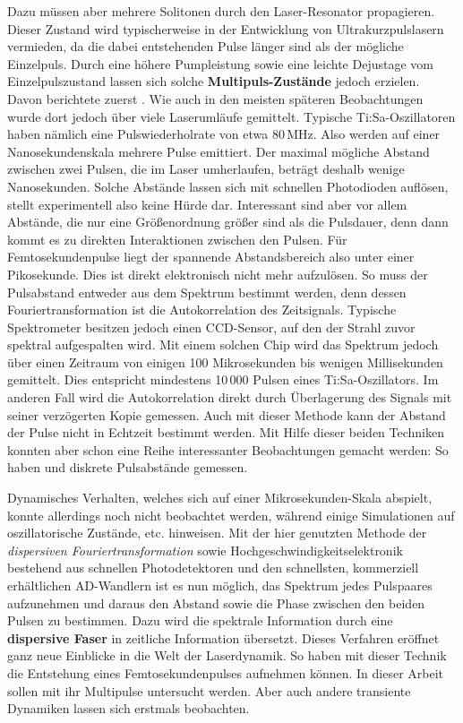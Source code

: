 \documentclass[bachelor,       %
               twoside,        %
               BCOR10mm,       %
               liststotoc,nomtotoc,bibtotoc, %
               english,ngerman, %
               final,          %
               ]{GAUBM}
\begin{document}
Dazu müssen aber mehrere Solitonen durch den Laser-Resonator propagieren.
Dieser Zustand wird typischerweise in der Entwicklung von Ultrakurzpulslasern vermieden, da die dabei entstehenden Pulse länger sind als der mögliche Einzelpuls.
Durch eine höhere Pumpleistung sowie eine leichte Dejustage vom Einzelpulszustand lassen sich solche \textbf{Multipuls-Zustände} jedoch erzielen.
Davon berichtete zuerst \cite{lai_multiple_1997}.
Wie auch in den meisten späteren Beobachtungen wurde dort jedoch über viele Laserumläufe gemittelt.
Typische Ti:Sa-Oszillatoren haben nämlich eine Pulswiederholrate von etwa 80\,MHz.
Also werden auf einer Nanosekundenskala mehrere Pulse emittiert.
Der maximal mögliche Abstand zwischen zwei Pulsen, die im Laser umherlaufen, beträgt deshalb wenige Nanosekunden.
Solche Abstände lassen sich mit schnellen Photodioden auflösen, stellt experimentell also keine Hürde dar.
Interessant sind aber vor allem Abstände, die nur eine Größenordnung größer sind als die Pulsdauer, denn dann kommt es zu direkten Interaktionen zwischen den Pulsen.
Für Femtosekundenpulse liegt der spannende Abstandsbereich also unter einer Pikosekunde.
Dies ist direkt elektronisch nicht mehr aufzulösen.
So muss der Pulsabstand entweder aus dem Spektrum bestimmt werden, denn dessen Fouriertransformation ist die Autokorrelation des Zeitsignals.
Typische Spektrometer besitzen jedoch einen CCD-Sensor, auf den der Strahl zuvor spektral aufgespalten wird.
Mit einem solchen Chip wird das Spektrum jedoch über einen Zeitraum von einigen 100 Mikrosekunden bis wenigen Millisekunden gemittelt.
Dies entspricht mindestens 10\,000 Pulsen eines Ti:Sa-Oszillators.
Im anderen Fall wird die Autokorrelation direkt durch Überlagerung des Signals mit seiner verzögerten Kopie gemessen.
Auch mit dieser Methode kann der Abstand der Pulse nicht in Echtzeit bestimmt werden.
Mit Hilfe dieser beiden Techniken konnten aber schon eine Reihe interessanter Beobachtungen gemacht werden:
So haben \cite{wang_pulse_1997} und \cite{kitano_stable_1998} diskrete Pulsabstände  gemessen.

Dynamisches Verhalten, welches sich auf einer Mikrosekunden-Skala abspielt, konnte allerdings noch nicht beobachtet werden, während einige Simulationen auf oszillatorische Zustände, etc. hinweisen.
Mit der hier genutzten Methode der \textit{dispersiven Fouriertransformation} sowie Hochgeschwindigkeitselektronik bestehend aus schnellen Photodetektoren und den schnellsten, kommerziell erhältlichen AD-Wandlern ist es nun möglich, das Spektrum jedes Pulspaares aufzunehmen und daraus den Abstand sowie die Phase zwischen den beiden Pulsen zu bestimmen.
Dazu wird die spektrale Information durch eine \textbf{dispersive Faser} in zeitliche Information übersetzt.
Dieses Verfahren eröffnet ganz neue Einblicke in die Welt der Laserdynamik.
So haben \cite{herink_resolving_2016} mit dieser Technik die Entstehung eines Femtosekundenpulses aufnehmen können.
In dieser Arbeit sollen mit ihr Multipulse untersucht werden.
Aber auch andere transiente Dynamiken lassen sich erstmals beobachten.
\end{document}
